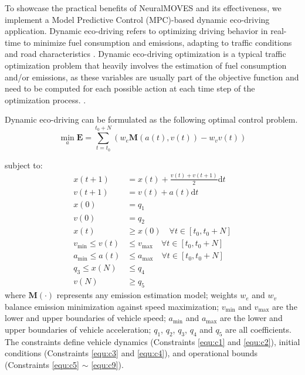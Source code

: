 \documentclass[12pt,english]{article}
\begin{document}
To showcase the practical benefits of NeuralMOVES and its effectiveness, we implement a Model Predictive Control (MPC)-based dynamic eco-driving application.
Dynamic eco-driving refers to optimizing driving behavior in real-time to minimize fuel consumption and emissions, adapting to traffic conditions and road characteristics \citep{Xia01012013,mintsis2020dynamic,YU2021103101}.
Dynamic eco-driving optimization is a typical traffic optimization problem that heavily involves the estimation of fuel consumption and/or emissions, as these variables are usually part of the objective function and need to be computed for each possible action at each time step of the optimization process.  \citep{HE2015106,ZHANG2023103607,LU2024104270,10693866}.


Dynamic eco-driving can be formulated as the following optimal control problem.
\begin{equation}
    \min_a \textbf{E} = \sum_{t=t_0}^{t_0+N} \left( w_e \mathbf{M}(a(t), v(t)) - w_v v(t) \right)
\end{equation}

subject to:
\begin{align}
x(t+1) &= x(t) + \frac{v(t)+v(t+1)}{2}\mathrm{d}t \label{equ:c1}\\
v(t+1) &= v(t) + a(t)\mathrm{d}t \label{equ:c2}\\
x(0) &= q_1 \label{equ:c3}\\
v(0) &= q_2 \label{equ:c4}\\
x(t) &\geq x(0) \quad \forall t \in [t_0, t_0+N] \label{equ:c5}\\
v_{\min} \leq v(t) &\leq v_{\max} \quad \forall t \in [t_0, t_0+N] \label{equ:c6}\\
a_{\min} \leq a(t) &\leq a_{\max} \quad \forall t \in [t_0, t_0+N] \label{equ:c7}\\
q_3 \leq x(N) &\leq q_4 \label{equ:c8} \\
v(N) &\geq q_5 \label{equ:c9}
\end{align}
where $\textbf{M}(\cdot)$ represents any emission estimation model; 
weights $w_e$ and $w_v$ balance emission minimization against speed maximization;
$v_{\min}$ and $v_{\max}$ are the lower and upper boundaries of vehicle speed;
$a_{\min}$ and $a_{\max}$ are the lower and upper boundaries of vehicle acceleration;
$q_1$, $q_2$, $q_3$, $q_4$ and $q_5$ are all coefficients.
The constraints define 
vehicle dynamics (Constraints \eqref{equ:c1} and \eqref{equ:c2}), 
initial conditions (Constraints \eqref{equ:c3} and \eqref{equ:c4}), 
and operational bounds (Constraints \eqref{equ:c5} $\sim$ \eqref{equ:c9}).
\end{document}
